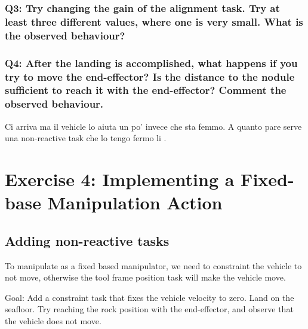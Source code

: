 \documentclass{article}
\begin{document}
\subsubsection{Q3: Try changing the gain of the alignment task. Try at least three different values, where one is very small. What is the observed behaviour?}

\subsubsection{Q4: After the landing is accomplished, what happens if you try to move the end-effector? Is the distance to the nodule sufficient to reach it with the end-effector? Comment the observed behaviour.}

Ci arriva ma il vehicle lo aiuta un po' invece che sta femmo.
A quanto pare serve una non-reactive task che lo tengo fermo li .


\clearpage
\section{Exercise 4: Implementing a Fixed-base Manipulation Action}
\subsection{Adding non-reactive tasks}
To manipulate as a fixed based manipulator, we need to constraint the vehicle to not move, otherwise the tool frame position task will make the vehicle move.

Goal: Add a constraint task that fixes the vehicle velocity to zero. Land on the seafloor. Try reaching the rock position with the end-effector, and observe that the vehicle does not move.
\end{document}
